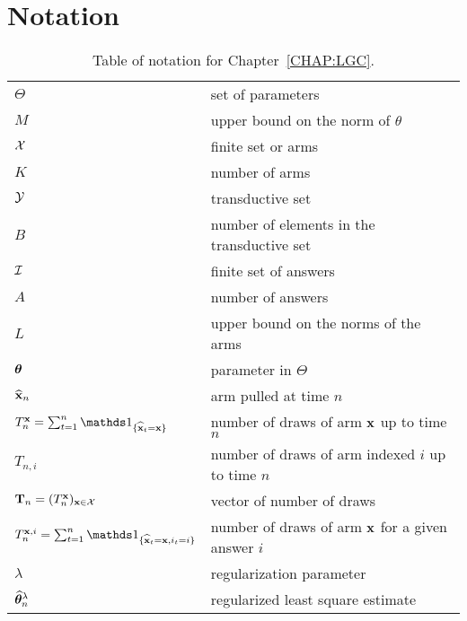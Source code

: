 \section{Notation}\label{app:lgc.notations}

\begin{table}[ht]
	\centering
	\caption{Table of notation for Chapter~\ref{CHAP:LGC}.}
	\begin{tabular}{@{}l|l@{}}
		\toprule
		\thead{Notation} & \thead{Meaning} \\ \midrule
		$\Theta$ & set of parameters \\
        $M$ & upper bound on the norm of $\theta$\\
		$\mathcal{X}$ & finite set or arms  \\
        $K$ & number of arms \\
        $\mathcal{Y}$ & transductive set \\
        $B$ & number of elements in the transductive set \\
        $\mathcal{I}$ & finite set of answers \\
        $A$ & number of answers \\
        $L$ & upper bound on the norms of the arms\\
        ${\boldsymbol \theta}$ & parameter in $\Theta$ \\
        $\widehat{{\bf x}}_n$ & arm pulled at time $n$ \\
        $T_n^\bx = \sum_{t=1}^n \ind_{\{\hbx_t = \bx\}}$ & number of draws of arm ${\bf x}$ up to time $n$\\
        $T_{n,i}$ & number of draws of arm indexed $i$ up to time $n$\\
        ${\bf T}_n =(T_n^{\bf x})_{{\bf x}\in\mathcal{X}}$ & vector of number of draws\\
        $T_n^{\bx,i} = \sum_{t=1}^n \ind_{\{\hbx_t = \bx, i_t = i\}}$ & number of draws of arm ${\bf x}$ for a given answer $i$\\
        $\lambda$ & regularization parameter\\
        $\widehat{{\boldsymbol \theta}}_n^\lambda$ & regularized least square estimate\\
		\bottomrule
	\end{tabular}
\end{table}
